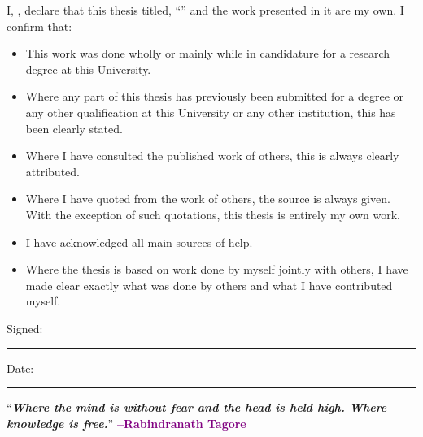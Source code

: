 \documentclass[
11pt, %
oneside, %
english, %
onehalfspacing, %
nolistspacing, %
liststotoc, %
headsepline, %
consistentlayout, %
]{name} %
\begin{document}
\begin{declaration}
\addchaptertocentry{\authorshipname} %
\noindent I, \authorname, declare that this thesis titled, \enquote{\ttitle} and the work presented in it are my own. I confirm that:

\begin{itemize} 
\item This work was done wholly or mainly while in candidature for a research degree at this University.
\item Where any part of this thesis has previously been submitted for a degree or any other qualification at this University or any other institution, this has been clearly stated.
\item Where I have consulted the published work of others, this is always clearly attributed.
\item Where I have quoted from the work of others, the source is always given. With the exception of such quotations, this thesis is entirely my own work.
\item I have acknowledged all main sources of help.
\item Where the thesis is based on work done by myself jointly with others, I have made clear exactly what was done by others and what I have contributed myself.\\
\end{itemize}
 
\noindent Signed:\\
\rule[0.5em]{25em}{0.5pt} %
 \noindent Date:\\
\rule[0.5em]{25em}{0.5pt} %
\end{declaration}
\cleardoublepage

\vspace*{0.2\textheight}
\noindent\enquote{\itshape \textbf{\Large{Where the mind is without fear and the head is held high. Where knowledge is free.}}}\bigbreak
\hfill \textbf{\Large{\textcolor{purple}{--Rabindranath Tagore}}}
\end{document}
